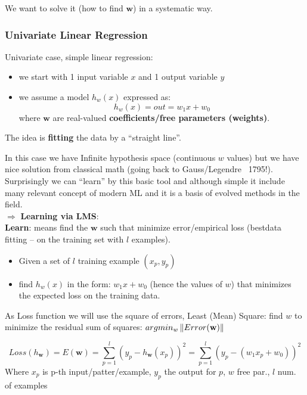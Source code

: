 \documentclass[../main.tex]{subfiles}
\begin{document}
We want to solve it (how to find $\mathbf{w}$) in a systematic way.

\subsubsection{Univariate Linear Regression}

Univariate case, simple linear regression:
\begin{itemize}
    \item we start with 1 input variable $x$ and 1 output variable $y$
    
    \item we assume a model $h_w(x)$ expressed as:
    $$ h_w(x) = out = w_1x + w_0$$
    where $\mathbf{w}$ are real-valued \textbf{coefficients/free parameters (weights)}.
    
    
\end{itemize}

\begin{center}
    The idea is \textbf{fitting} the data by a  “straight line”.
\end{center}

In this case we have Infinite hypothesis space (continuous $w$ values) but we have nice solution from classical math (going back to Gauss/Legendre ~1795!). Surprisingly we can “learn” by this basic tool and although simple it include many relevant concept of modern ML and it is
a basis of evolved methods in the field.\\

\noindent $\Rightarrow$ \textbf{Learning via LMS}:\\
\textbf{Learn}: means find the $\textbf{w}$ such that minimize error/empirical loss (bestdata fitting – on the training set with $l$ examples).

\begin{itemize}
    \item Given a set of $l$ training example $(x_p, y_p)$
    \item find $h_w(x)$ in the form: $w_1x + w_0$ (hence the values of $w$) that minimizes the expected loss on the training data.
\end{itemize}

As Loss function we will use the square of errors, Least (Mean) Square: find $w$ to minimize the residual sum of squares: $argmin_w \left\lVert Error(\mathbf{w})\right\rVert$ 

\[
Loss(h_\mathbf{w}) = E(\textbf{w}) = \sum_{p = 1}^{l} (y_p - h_\mathbf{w}(x_p))^2 = \sum_{p = 1}^{l} (y_p - (w_1x_p + w_0))^2
\]
Where $x_p$ is p-th input/patter/example, $y_p$ the output for $p$, $w$ free par., $l$ num. of examples\\
\end{document}
